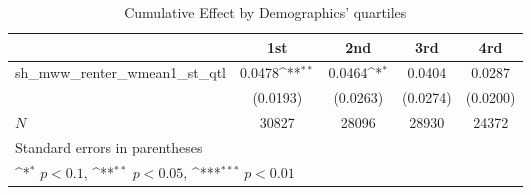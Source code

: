 \begin{table}[htbp]\centering
\def\sym#1{\ifmmode^{#1}\else\(^{#1}\)\fi}
\caption{Cumulative Effect by Demographics' quartiles}
\begin{tabular}{l*{4}{c}}
\hline\hline
            &\multicolumn{1}{c}{1st}&\multicolumn{1}{c}{2nd}&\multicolumn{1}{c}{3rd}&\multicolumn{1}{c}{4rd}\\
\hline
sh\_mww\_renter\_wmean1\_st\_qtl&      0.0478\sym{**} &      0.0464\sym{*}  &      0.0404         &      0.0287         \\
            &    (0.0193)         &    (0.0263)         &    (0.0274)         &    (0.0200)         \\
\hline
\(N\)       &       30827         &       28096         &       28930         &       24372         \\
\hline\hline
\multicolumn{5}{l}{\footnotesize Standard errors in parentheses}\\
\multicolumn{5}{l}{\footnotesize \sym{*} \(p<0.1\), \sym{**} \(p<0.05\), \sym{***} \(p<0.01\)}\\
\end{tabular}
\end{table}
